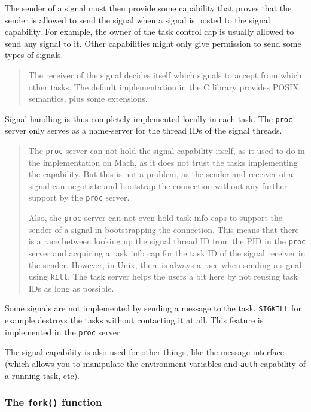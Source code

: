 \documentclass[9pt,a4paper]{extarticle}
\newenvironment{comment}{\footnotesize \begin{quote}}{\end{quote}}
\begin{document}
The sender of a signal must then provide some capability that proves
that the sender is allowed to send the signal when a signal is posted
to the signal capability.  For example, the owner of the task control
cap is usually allowed to send any signal to it.  Other capabilities
might only give permission to send some types of signals.

\begin{comment}
  The receiver of the signal decides itself which signals to accept
  from which other tasks.  The default implementation in the C library
  provides POSIX semantics, plus some extensions.
\end{comment}

Signal handling is thus completely implemented locally in each task.
The \texttt{proc} server only serves as a name-server for the thread
IDs of the signal threads.

\begin{comment}
  The \texttt{proc} server can not hold the signal capability itself,
  as it used to do in the implementation on Mach, as it does not trust
  the tasks implementing the capability.  But this is not a problem,
  as the sender and receiver of a signal can negotiate and bootstrap
  the connection without any further support by the \texttt{proc}
  server.
  
  Also, the \texttt{proc} server can not even hold task info caps to
  support the sender of a signal in bootstrapping the connection.
  This means that there is a race between looking up the signal thread
  ID from the PID in the \texttt{proc} server and acquiring a task
  info cap for the task ID of the signal receiver in the sender.
  However, in Unix, there is always a race when sending a signal using
  \verb/kill/.  The task server helps the users a bit here by not
  reusing task IDs as long as possible.
\end{comment}

Some signals are not implemented by sending a message to the task.
\verb/SIGKILL/ for example destroys the tasks without contacting it at
all.  This feature is implemented in the \texttt{proc} server.

The signal capability is also used for other things, like the message
interface (which allows you to manipulate the environment variables
and \texttt{auth} capability of a running task, etc).


\subsubsection{The \texttt{fork()} function}
\end{document}
